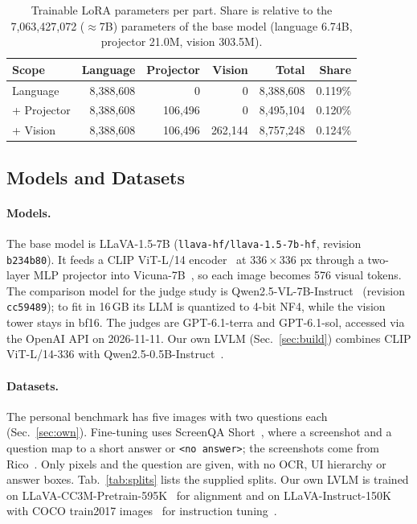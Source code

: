 \documentclass[10pt,twocolumn,letterpaper]{article}
\newcommand{\noans}{\texttt{\textless no answer\textgreater}}
\begin{document}
\begin{table}[t]
  \centering
  \small
  \setlength{\tabcolsep}{4pt}
  \begin{tabular}{lrrrrr}
    \toprule
    Scope & Language & Projector & Vision & Total & Share \\
    \midrule
    Language     & 8,388,608 & 0       & 0       & 8,388,608 & 0.119\% \\
    + Projector  & 8,388,608 & 106,496 & 0       & 8,495,104 & 0.120\% \\
    + Vision     & 8,388,608 & 106,496 & 262,144 & 8,757,248 & 0.124\% \\
    \bottomrule
  \end{tabular}
  \caption{Trainable LoRA parameters per part. Share is relative to the 7,063,427,072 ($\approx$7B) parameters of the base model (language 6.74B, projector 21.0M, vision 303.5M).}
  \label{tab:params}
\end{table}

\subsection{Models and Datasets}

\paragraph{Models.} The base model is LLaVA-1.5-7B\cite{llavahf2023llava15_7b} (\texttt{llava-hf/llava-1.5-7b-hf}, revision \texttt{b234b80}). It feeds a CLIP ViT-L/14 encoder~\cite{radford2021clip} at $336\times336$ px through a two-layer MLP projector into Vicuna-7B~\cite{vicuna2023}, so each image becomes 576 visual tokens. The comparison model for the judge study is Qwen2.5-VL-7B-Instruct~\cite{bai2025qwen25vl} (revision \texttt{cc59489}); to fit in 16\,GB its LLM is quantized to 4-bit NF4, while the vision tower stays in bf16. The judges are GPT-6.1-terra and GPT-6.1-sol, accessed via the OpenAI API on 2026-11-11. Our own LVLM (Sec.~\ref{sec:build}) combines CLIP ViT-L/14-336 with Qwen2.5-0.5B-Instruct~\cite{qwen2025qwen25}.

\paragraph{Datasets.} The personal benchmark has five images with two questions each (Sec.~\ref{sec:own}).
Fine-tuning uses ScreenQA Short~\cite{hsiao2024screenqa,screenqa_dataset}, where a
screenshot and a question map to a short answer or \noans; the screenshots come
from Rico~\cite{10.1145/3126594.3126651}. Only pixels and the question are given, with no OCR, UI hierarchy or answer boxes. Tab.~\ref{tab:splits} lists the supplied splits. Our own LVLM is trained on LLaVA-CC3M-Pretrain-595K~\cite{sharma2018cc3m} for alignment and on LLaVA-Instruct-150K with COCO train2017 images~\cite{lin2014coco} for instruction tuning~\cite{NEURIPS2023_6dcf277e}.
\end{document}
